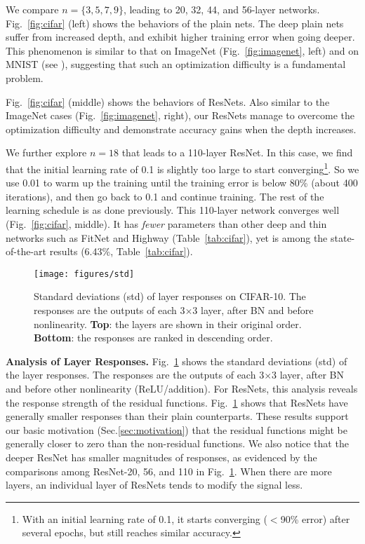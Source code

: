 We compare $n=\{3,5,7,9\}$, leading to 20, 32, 44, and 56-layer networks.
Fig.~\ref{fig:cifar} (left) shows the behaviors of the plain nets. The deep plain nets suffer from increased depth, and exhibit higher training error when going deeper. This phenomenon is similar to that on ImageNet (Fig.~\ref{fig:imagenet}, left) and on MNIST (see \cite{Srivastava2015}), suggesting that such an optimization difficulty is a fundamental problem.

Fig.~\ref{fig:cifar} (middle) shows the behaviors of ResNets. Also similar to the ImageNet cases (Fig.~\ref{fig:imagenet}, right), our ResNets manage to overcome the optimization difficulty and demonstrate accuracy gains when the depth increases.

We further explore $n=18$ that leads to a 110-layer ResNet. In this case, we find that the initial learning rate of 0.1 is slightly too large to start converging\footnote{With an initial learning rate of 0.1, it starts converging ($<$90\% error) after several epochs, but still reaches similar accuracy.}. So we use 0.01 to warm up the training until the training error is below 80\% (about 400 iterations), and then go back to 0.1 and continue training. The rest of the learning schedule is as done previously. This 110-layer network converges well (Fig.~\ref{fig:cifar}, middle). It has \emph{fewer} parameters than other deep and thin networks such as FitNet \cite{Romero2015} and Highway \cite{Srivastava2015} (Table~\ref{tab:cifar}), yet is among the state-of-the-art results (6.43\%, Table~\ref{tab:cifar}).

\begin{figure}[t]
\begin{center}
\texttt{[image: figures/std]}
\end{center}
\vspace{-1.5em}
\caption{Standard deviations (std) of layer responses on CIFAR-10. The responses are the outputs of each 3$\times$3 layer, after BN and before nonlinearity. \textbf{Top}: the layers are shown in their original order. \textbf{Bottom}: the responses are ranked in descending order.}
\label{fig:std}
\end{figure}


\vspace{6pt}
\noindent\textbf{Analysis of Layer Responses.}
Fig.~\ref{fig:std} shows the standard deviations (std) of the layer responses. The responses are the outputs of each 3$\times$3 layer, after BN and before other nonlinearity (ReLU/addition). For ResNets, this analysis reveals the response strength of the residual functions.
Fig.~\ref{fig:std} shows that ResNets have generally smaller responses than their plain counterparts. These results support our basic motivation (Sec.\ref{sec:motivation}) that the residual functions might be generally closer to zero than the non-residual functions.
We also notice that the deeper ResNet has smaller magnitudes of responses, as evidenced by the comparisons among ResNet-20, 56, and 110 in Fig.~\ref{fig:std}. When there are more layers, an individual layer of ResNets tends to modify the signal less.

